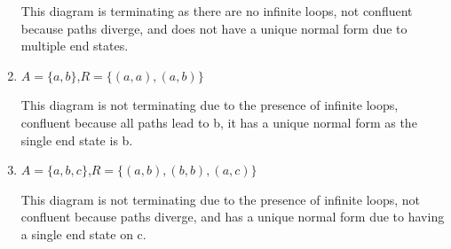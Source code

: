 \documentclass{article}
\theoremstyle{theorem}
\theoremstyle{definition}
\theoremstyle{remark}
\begin{document}
\begin{enumerate}
    \begin{center}
    \end{center}
    This diagram is terminating as there are no infinite loops, not confluent because paths diverge, and does not have a unique normal form due to multiple end states.

\vspace{2em}

    \item $A = \{ a, b \}$,\quad $R = \{ (a,a), (a,b) \}$

    \begin{center}
    \end{center}
    This diagram is not terminating due to the presence of infinite loops, confluent because all paths lead to b, it has a unique normal form as the single end state is b.

\vspace{2em}

    \item $A = \{ a, b, c \}$,\quad $R = \{ (a,b), (b,b), (a,c) \}$

    \begin{center}
    \end{center}
    This diagram is not terminating due to the presence of infinite loops, not confluent because paths diverge, and has a unique normal form due to having a single end state on c.


\end{enumerate}
\end{document}
